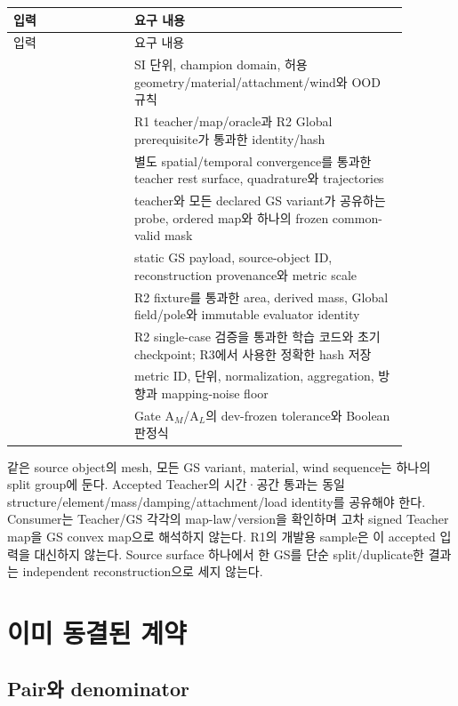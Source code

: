 \documentclass[10pt,a4paper]{article}
\begin{document}
\begin{longtable}{L{0.27\linewidth}L{0.61\linewidth}}
\toprule
입력 & 요구 내용\\
\midrule
\endfirsthead
\toprule
입력 & 요구 내용\\
\midrule
\endhead
{} & SI 단위, champion domain, 허용 geometry/material/attachment/wind와 OOD 규칙\\
 & R1 teacher/map/oracle과 R2 Global prerequisite가 통과한 identity/hash\\
 & 별도 spatial/temporal convergence를 통과한 teacher rest surface, quadrature와 trajectories\\
 & teacher와 모든 declared GS variant가 공유하는 probe, ordered map와 하나의 frozen common-valid mask\\
 & static GS payload, source-object ID, reconstruction provenance와 metric scale\\
 & R2 fixture를 통과한 area, derived mass, Global field/pole와 immutable evaluator identity\\
 & R2 single-case 검증을 통과한 학습 코드와 초기 checkpoint; R3에서 사용한 정확한 hash 저장\\
 & metric ID, 단위, normalization, aggregation, 방향과 mapping-noise floor\\
 & Gate A\(_M\)/A\(_L\)의 dev-frozen tolerance와 Boolean 판정식\\
\bottomrule
\end{longtable}

같은 source object의 mesh, 모든 GS variant, material, wind sequence는 하나의 split group에 둔다.
Accepted Teacher의 시간·공간 통과는 동일 structure/element/mass/damping/attachment/load identity를
공유해야 한다. Consumer는 Teacher/GS 각각의 map-law/version을 확인하며 고차 signed Teacher map을
GS convex map으로 해석하지 않는다. R1의 개발용 sample은 이 accepted 입력을 대신하지 않는다.
Source surface 하나에서 한 GS를 단순 split/duplicate한 결과는 independent reconstruction으로 세지 않는다.

\section{이미 동결된 계약}
\label{sec:r3-chapter-3}

\subsection{Pair와 denominator}
\end{document}
